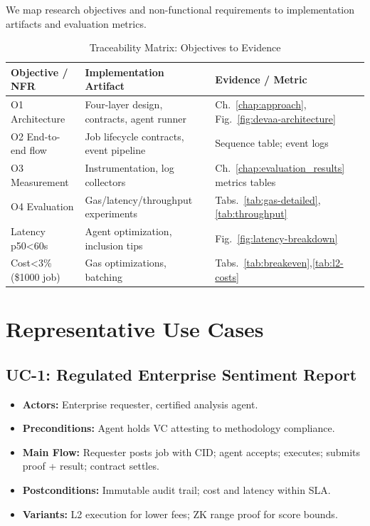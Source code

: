 We map research objectives and non-functional requirements to implementation artifacts and evaluation metrics.
\begin{table}[h]
\centering
\caption{Traceability Matrix: Objectives to Evidence}
\label{tab:traceability}
\begin{tabular}{p{3cm}p{5.5cm}p{6.5cm}}
\toprule
\textbf{Objective / NFR} & \textbf{Implementation Artifact} & \textbf{Evidence / Metric} \\
\midrule
O1 Architecture & Four-layer design, contracts, agent runner & Ch.~\ref{chap:approach}, Fig.~\ref{fig:devaa-architecture} \\
O2 End-to-end flow & Job lifecycle contracts, event pipeline & Sequence table; event logs \\
O3 Measurement & Instrumentation, log collectors & Ch.~\ref{chap:evaluation_results} metrics tables \\
O4 Evaluation & Gas/latency/throughput experiments & Tabs.~\ref{tab:gas-detailed},\ref{tab:throughput} \\
Latency p50<60s & Agent optimization, inclusion tips & Fig.~\ref{fig:latency-breakdown} \\
Cost<3\% (\$1000 job) & Gas optimizations, batching & Tabs.~\ref{tab:breakeven},\ref{tab:l2-costs} \\
\bottomrule
\end{tabular}
\end{table}

\section{Representative Use Cases}

\subsection{UC-1: Regulated Enterprise Sentiment Report}
\begin{itemize}
    \item \textbf{Actors:} Enterprise requester, certified analysis agent.
    \item \textbf{Preconditions:} Agent holds VC attesting to methodology compliance.
    \item \textbf{Main Flow:} Requester posts job with CID; agent accepts; executes; submits proof + result; contract settles.
    \item \textbf{Postconditions:} Immutable audit trail; cost and latency within SLA.
    \item \textbf{Variants:} L2 execution for lower fees; ZK range proof for score bounds.
\end{itemize}

